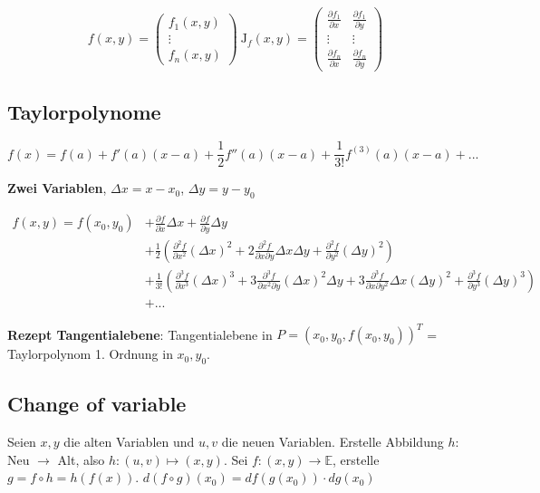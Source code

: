 \[
    f(x, y) =
        \begin{pmatrix}
            f_1(x, y)\\
            \vdots\\
            f_n(x, y)
        \end{pmatrix}\ 
    \text{J}_f(x, y) =
        \begin{pmatrix}
                \frac{\partial f_1}{\partial x} & \frac{\partial f_1}{\partial y}\\
                \vdots&\vdots\\
            \frac{\partial f_n}{\partial x} & \frac{\partial f_n}{\partial y}
        \end{pmatrix}
\]

\subsection{Taylorpolynome}

\[
    f(x) = f(a) + f'(a)(x-a) + \frac{1}{2} f''(a)(x-a) + \frac{1}{3!} f^{(3)}(a)(x-a) + ...
\]

\textbf{Zwei Variablen}, $\Delta x = x - x_0$, $\Delta y = y - y_0$

\begin{align*}
    f(x, y) = f(x_0, y_0) &+ \frac{\partial f}{\partial x} \Delta x + \frac{\partial f}{\partial y} \Delta y\\
    &+ \frac{1}{2} \left(\frac{\partial^2 f}{\partial x^2} (\Delta x)^2 + 2\frac{\partial^2 f}{\partial x \partial y} \Delta x \Delta y + \frac{\partial^2 f}{\partial y^2} (\Delta y)^2\right)\\
    &+ \frac{1}{3!} \left(\frac{\partial^3 f}{\partial x^3} (\Delta x)^3 + 3\frac{\partial^3 f}{\partial x^2 \partial y} (\Delta x)^2 \Delta y + 3\frac{\partial^3 f}{\partial x \partial y^2} \Delta x (\Delta y)^2 + \frac{\partial^3 f}{\partial y^3} (\Delta y)^3\right)\\
    & + ...
\end{align*}

\textbf{Rezept Tangentialebene}: Tangentialebene in $P=(x_0, y_0, f(x_0, y_0))^T$ = Taylorpolynom 1. Ordnung in $x_0, y_0$.

\subsection{Change of variable}

Seien $x, y$ die alten Variablen und $u, v$ die neuen Variablen. Erstelle Abbildung $h:$ Neu $\to$ Alt, also $h: (u, v) \mapsto (x, y)$. Sei $f: (x, y) \to \mathbb{E}$, erstelle $g = f \circ h = h(f(x))$. $d (f \circ g) (x_0) = df(g(x_0)) \cdot dg(x_0)$

